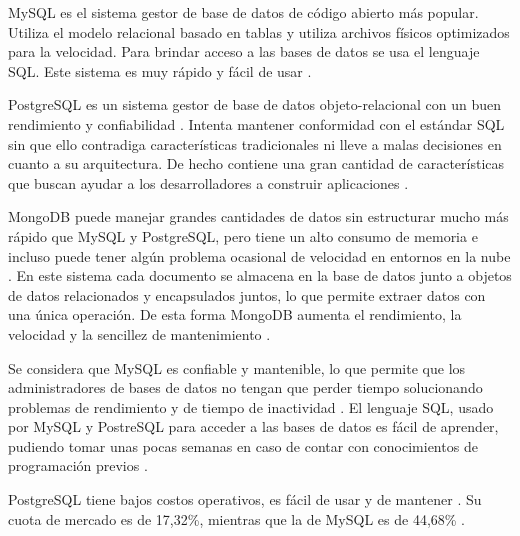 \documentclass{article}
\begin{document}
MySQL es el sistema gestor de base de datos de código abierto más popular. Utiliza el modelo relacional basado en tablas y utiliza archivos físicos optimizados para la velocidad. Para brindar acceso a las bases de datos se usa el lenguaje SQL. Este sistema es muy rápido y fácil de usar \parencite{whatIsMySQLOracle}.

PostgreSQL es un sistema gestor de base de datos objeto-relacional con un buen rendimiento y confiabilidad \parencite{postgreHome}. Intenta mantener conformidad con el estándar SQL sin que ello contradiga características tradicionales ni lleve a malas decisiones en cuanto a su arquitectura. De hecho contiene una gran cantidad de características que buscan ayudar a los desarrolladores a construir aplicaciones \parencite{postgreAbout}.

MongoDB puede manejar grandes cantidades de datos sin estructurar mucho más rápido que MySQL y PostgreSQL, pero tiene un alto consumo de memoria e incluso puede tener algún problema ocasional de velocidad en entornos en la nube \parencite{mongoMysqlComparison}. En este sistema cada documento se almacena en la base de datos junto a objetos de datos relacionados y encapsulados juntos, lo que permite extraer datos con una única operación. De esta forma MongoDB aumenta el rendimiento, la velocidad y la sencillez de mantenimiento \parencite{vsoftconsultingMongo}.

Se considera que MySQL es confiable y mantenible, lo que permite que los administradores de bases de datos no tengan que perder tiempo solucionando problemas de rendimiento y de tiempo de inactividad \parencite{dbquestMysql}. El lenguaje SQL, usado por MySQL y PostreSQL para acceder a las bases de datos es fácil de aprender, pudiendo tomar unas pocas semanas en caso de contar con conocimientos de programación previos \parencite{thinkfulSql}.

PostgreSQL tiene bajos costos operativos, es fácil de usar y de mantener \parencite{topcoderPostgresql}. Su cuota de mercado es de 17,32\%, mientras que la de MySQL es de 44,68\% \parencite{marketShareDb}.
\end{document}
